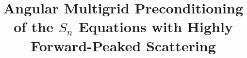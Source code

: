 \documentclass{article}
\renewcommand{\(}{\left(}
\renewcommand{\)}{\right)}
\renewcommand{\[}{\left[}
\renewcommand{\]}{\right]}
\begin{document}
\title{Angular Multigrid Preconditioning of the $S_n$ Equations with
Highly Forward-Peaked Scattering}
\author{} 
\date{}
\maketitle

\doublespacing













\end{document}
